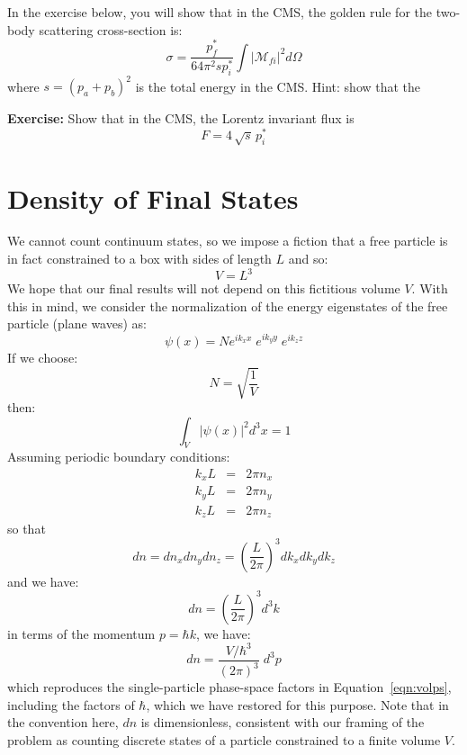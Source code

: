 \documentclass[12pt]{article}
\begin{document}
In the exercise below, you will show that in the CMS, the golden rule for the two-body scattering  cross-section is:
\begin{equation}
\label{eqn:fgr-sigma-two-body}
\sigma = \frac{p_f^*}{64 \pi^2 s p_i^*} \int |\mathcal{M}_{fi}|^2 d\Omega
\end{equation}
where $s = (p_a + p_b)^2$ is the total energy in the CMS.  Hint: show that the

\noindent
{\bf Exercise: } Show that in the CMS, the Lorentz invariant flux is
$$F = 4 \, \sqrt{s} \, p_i^*$$

\appendix

\section{Density of Final States}
\label{sec:density}
We cannot count continuum states, so we impose a fiction that a free particle is in fact constrained to a box with sides of length $L$ and so:
$$V = L^3$$
We hope that our final results will not depend on this fictitious
volume $V$.  With this in mind, we consider the normalization of the energy eigenstates of the free particle (plane waves) as:
$$\psi(x) = N e^{i k_x x} \;e^{i k_y y} \;e^{i k_z z} $$
If we choose:
$$N = \sqrt{\frac{1}{V}}$$
then:
$$\int_V |\psi(x)|^2 d^3x = 1 $$
Assuming periodic boundary conditions:
\begin{eqnarray*}
  k_x L &=& 2 \pi n_x  \\
  k_y L &=& 2 \pi n_y  \\
  k_z L &=& 2 \pi n_z
\end{eqnarray*}
so that
$$dn = dn_x dn_y dn_z = \left( \frac{L}{2\pi} \right)^3 dk_x dk_y dk_z$$
and we have:
\begin{equation}
\label{eqn:dndthreek}
dn = \left( \frac{L}{2\pi} \right)^3 d^3k
\end{equation}
in terms of the momentum $p = \hbar k$, we have:
\begin{equation}
\label{eqn:dndthreep}
dn = \frac{V/\hbar^3}{(2\pi)^3} \; d^3p
\end{equation}
which reproduces the single-particle phase-space factors in
Equation~\ref{eqn:volps}, including the factors of $\hbar$, which we have restored for this purpose.  Note that
in the convention here, $dn$ is dimensionless, consistent with our
framing of the problem as counting discrete states of a particle
constrained to a finite volume $V$.
\end{document}
